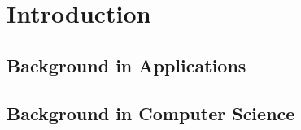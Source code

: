 \section{Introduction}
\subsection{Background in Applications}
\subsection{Background in Computer Science}
